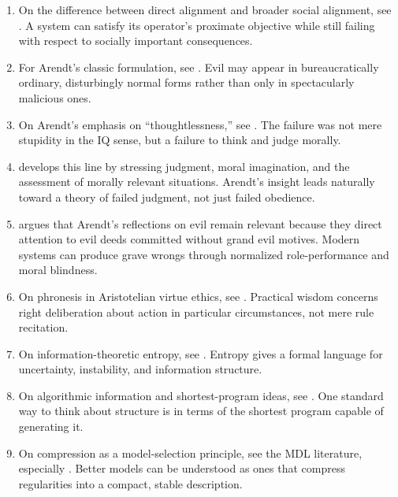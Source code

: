 \documentclass[preprint]{article}
\begin{document}
\begin{enumerate}
\item On the difference between direct alignment and broader social alignment, see \citet{korinek2024aligned}. A system can satisfy its operator's proximate objective while still failing with respect to socially important consequences.

\item For Arendt's classic formulation, see \citet{arendt1963eichmann}. Evil may appear in bureaucratically ordinary, disturbingly normal forms rather than only in spectacularly malicious ones.

\item On Arendt's emphasis on ``thoughtlessness,'' see \citet{arendt2003responsibility}. The failure was not mere stupidity in the IQ sense, but a failure to think and judge morally.

\item \citet{benhabib1988judgment} develops this line by stressing judgment, moral imagination, and the assessment of morally relevant situations. Arendt's insight leads naturally toward a theory of failed judgment, not just failed obedience.

\item \citet{bernstein2002radical} argues that Arendt's reflections on evil remain relevant because they direct attention to evil deeds committed without grand evil motives. Modern systems can produce grave wrongs through normalized role-performance and moral blindness.

\item On phronesis in Aristotelian virtue ethics, see \citet{aristotle_ne}. Practical wisdom concerns right deliberation about action in particular circumstances, not mere rule recitation.

\item On information-theoretic entropy, see \citet{shannon1948}. Entropy gives a formal language for uncertainty, instability, and information structure.

\item On algorithmic information and shortest-program ideas, see \citet{sep_information}. One standard way to think about structure is in terms of the shortest program capable of generating it.

\item On compression as a model-selection principle, see the MDL literature, especially \citet{grunwald2007mdl}. Better models can be understood as ones that compress regularities into a compact, stable description.
\end{enumerate}
\end{document}
